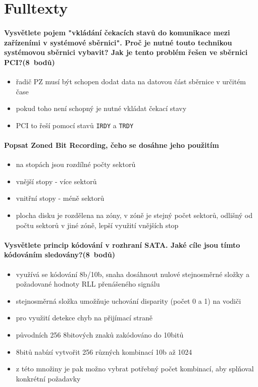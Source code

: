 \documentclass[a5paper,10pt]{article}
\begin{document}
\section{Fulltexty}

\paragraph{Vysvětlete pojem "vkládání čekacích stavů do komunikace mezi zařízeními v systémové sběrnici". Proč je nutné touto technikou systémovou sběrnici vybavit? Jak je tento problém řešen ve sběrnici PCI?\hfill(8~bodů)}
\begin{itemize}
	\item řadič PZ musí být schopen dodat data na datovou část sběrnice v určitém čase
	\item pokud toho není schopný je nutné vkládat čekací stavy
	\item PCI to řeší pomocí stavů \texttt{IRDY} a \texttt{TRDY}
\end{itemize}

\paragraph{Popsat Zoned Bit Recording, čeho se dosáhne jeho použitím}
\begin{itemize}
	\item na stopách jsou rozdílné počty sektorů
	\item vnější stopy - více sektorů
	\item vnitřní stopy - méně sektorů
	\item plocha disku je rozdělena na zóny, v zóně je stejný počet sektorů, odlišný od počtu sektorů v jiné zóně, lepší využití vnějších stop
\end{itemize}

\paragraph{Vysvětlete princip kódování v rozhraní SATA. Jaké cíle jsou tímto kódováním sledovány?\hfill(8~bodů)}
\begin{itemize}
	\item využívá se kódování 8b/10b, snaha dosáhnout nulové stejnosměrné složky a požadované hodnoty RLL přenášeného signálu
	\item stejnosměrná složka umožňuje uchování disparity (počet 0 a 1) na vodiči
	\item pro využití detekce chyb na přijímací straně
	\item původních 256 8bitových znaků zakódováno do 10bitů
	\item 8bitů nabízí vytvořit 256 různých kombinací 10b až 1024
	\item z této množiny je pak možno vybrat potřebný počet kombinací, aby splňoval konkrétní požadavky
\end{itemize}
\end{document}
